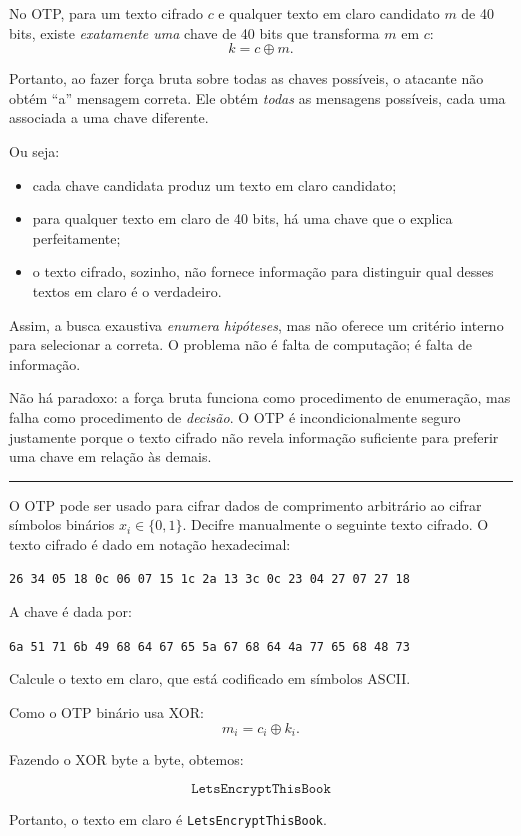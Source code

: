 \documentclass[12pt,a4paper]{article}
\newcommand{\exercicio}[1]{%
    \par\vspace{1.2em}
    \noindent
    {\color{black!55}\rule[-0.25em]{3pt}{1.6em}}%
    \hspace{0.6em}{\Large\bfseries Exerc\'{i}cio #1}
    \par\vspace{-0.4em}
    \noindent{\color{black!35}\rule{\textwidth}{0.4pt}}
    \par\vspace{0.35em}
}
\newenvironment{resposta}{%
    \begin{respostabox}
    \color{red!70!black}\sloppy
}{%
    \end{respostabox}
}
\begin{document}
\begin{resposta}

No OTP, para um texto cifrado $c$ e qualquer texto em claro candidato $m$ de 40 bits, existe \emph{exatamente uma} chave de 40 bits que transforma $m$ em $c$:
\[
k = c \oplus m.
\]

Portanto, ao fazer força bruta sobre todas as chaves possíveis, o atacante não obtém ``a'' mensagem correta. Ele obtém \emph{todas} as mensagens possíveis, cada uma associada a uma chave diferente.

Ou seja:
\begin{itemize}
    \item cada chave candidata produz um texto em claro candidato;
    \item para qualquer texto em claro de 40 bits, há uma chave que o explica perfeitamente;
    \item o texto cifrado, sozinho, não fornece informação para distinguir qual desses textos em claro é o verdadeiro.
\end{itemize}

Assim, a busca exaustiva \emph{enumera hipóteses}, mas não oferece um critério interno para selecionar a correta. O problema não é falta de computação; é falta de informação.

Não há paradoxo: a força bruta funciona como procedimento de enumeração, mas falha como procedimento de \emph{decisão}. O OTP é incondicionalmente seguro justamente porque o texto cifrado não revela informação suficiente para preferir uma chave em relação às demais.
\end{resposta}

\exercicio{5}
O OTP pode ser usado para cifrar dados de comprimento arbitrário ao cifrar símbolos binários $x_i \in \{0,1\}$. Decifre manualmente o seguinte texto cifrado. O texto cifrado é dado em notação hexadecimal:

\texttt{26 34 05 18 0c 06 07 15 1c 2a 13 3c 0c 23 04 27 07 27 18}

A chave é dada por:

\texttt{6a 51 71 6b 49 68 64 67 65 5a 67 68 64 4a 77 65 68 48 73}

Calcule o texto em claro, que está codificado em símbolos ASCII.

\begin{resposta}

Como o OTP binário usa XOR:
\[
m_i = c_i \oplus k_i.
\]

Fazendo o XOR byte a byte, obtemos:

\[
\texttt{LetsEncryptThisBook}
\]

Portanto, o texto em claro é \texttt{LetsEncryptThisBook}.
\end{resposta}
\end{document}
